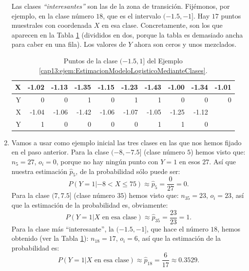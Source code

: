\begin{ejemplo}
\begin{enumerate}
      Las clases {\em ``interesantes''} son las de la zona de transición. Fijémonos, por ejemplo, en la clase número $18$, que es el intervalo $(-1.5,-1]$. Hay $17$ puntos muestrales con coordenada $X$ en esa clase. Concretamente, son los que aparecen en la Tabla \ref{cap13:tabla:Clase18EjemploModeloMedianteClases} (divididos en dos, porque la tabla es demasiado ancha para caber en una fila). Los valores de $Y$ ahora son ceros y unos  mezclados.
        \begin{table}[ht]
        \centering
        {\small
        \begin{tabular}{rrrrrrrrrr}
          \hline
        X & -1.02 & -1.13 & -1.35 & -1.15 & -1.23 & -1.43 & -1.00 & -1.34 & -1.01 \\
        \hline
          Y & 0 & 0 & 1 & 0 & 1 & 1 & 0 & 0 & 0 \\
           \hline
           \hline
         X  & -1.04 & -1.06 & -1.42 & -1.06 & -1.07 & -1.05 & -1.25 & -1.12 \\
         \hline
         Y & 1 & 0 & 0 & 0 & 0 & 1 & 1 & 0 \\
         \hline
        \end{tabular}
        }
        \caption{Puntos de la clase $(-1.5,1]$ del Ejemplo \ref{cap13:ejem:EstimacionModeloLogisticoMedianteClases}.}
        \label{cap13:tabla:Clase18EjemploModeloMedianteClases}
        \end{table}
  \item Vamos a usar como ejemplo inicial las tres clases en las que nos hemos fijado en el paso anterior. Para la clase $(-8,-7.5]$ (clase número $5$) hemos visto que:
      $n_{5}=27$, $o_i=0$, porque no hay ningún punto con $Y=1$ en esos $27$. Así que nuestra estimación $\hat p_{5}$, de la probabilidad sólo puede ser:
      \[P(Y=1|-8<X\leq 75)\approx \hat p_5=\dfrac{0}{27}=0.\]
      Para la clase $(7,7.5]$ (clase número $35$) hemos visto que:
      $n_{35}=23$, $o_i=23$, así que la estimación de la probabilidad es, obviamente:
      \[P(Y=1|X\mbox{ en esa clase})\approx \hat p_{35}=\dfrac{23}{23}=1.\]
      Para la clase más ``interesante'', la $(-1.5,-1]$, que hace el número $18$, hemos obtenido (ver la Tabla \ref{cap13:tabla:Clase18EjemploModeloMedianteClases}):
      $n_{18}=17$, $o_i=6$, así que la estimación de la probabilidad es:
      \[P(Y=1|X\mbox{ en esa clase})\approx \hat p_{18}=\dfrac{6}{17}\approx 0.3529.\]


\end{enumerate}
\end{ejemplo}
